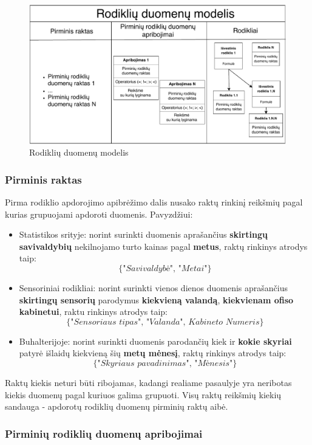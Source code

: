 \documentclass{VUMIFPSbakalaurinis}
\begin{document}
\begin{figure}[H]
    \includegraphics[width=1\textwidth]{img/rodiklio_modelis.pdf}
    \caption{Rodiklių duomenų modelis}
    \label{img:rodiklio_apibrezimas}
\end{figure}

\subsubsection{Pirminis raktas}

Pirma rodiklio apdorojimo apibrėžimo dalis nusako raktų rinkinį reikšmių pagal kurias grupuojami apdoroti duomenis. Pavyzdžiui:
\begin{itemize}
    \item Statistikos srityje: norint surinkti duomenis aprašančius \textbf{skirtingų savivaldybių} nekilnojamo turto kainas pagal \textbf{metus}, raktų rinkinys atrodys taip: \[\{\textit{"Savivaldybė", "Metai"}\}\]
    \item Sensoriniai rodikliai: norint surinkti vienos dienos duomenis aprašančius \textbf{skirtingų sensorių} parodymus \textbf{kiekvieną valandą}, \textbf{kiekvienam ofiso kabinetui}, raktu rinkinys atrodys taip: \[\{\textit{"Sensoriaus tipas", "Valanda", Kabineto Numeris}\}\] 
    \item Buhalterijoje: norint surinkti duomenis parodančių kiek ir \textbf{kokie skyriai} patyrė išlaidų kiekvieną šių \textbf{metų mėnesį}, raktų rinkinys atrodys taip: \[\{\textit{"Skyriaus pavadinimas", "Mėnesis"}\}\] 
\end{itemize}  \par
Raktų kiekis neturi būti ribojamas, kadangi realiame pasaulyje yra neribotas kiekis duomenų pagal kuriuos galima grupuoti. Visų raktų reikšmių kiekių sandauga - apdorotų rodiklių duomenų pirminių raktų aibė. 

\subsubsection{Pirminių rodiklių duomenų apribojimai}
\end{document}
